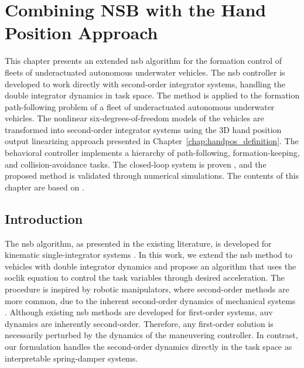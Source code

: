 \chapter{Combining NSB with the Hand Position Approach}
\label{chap:handpos_NSB}

This chapter presents an extended \acrfull{nsb} algorithm for the formation control of fleets of underactuated autonomous underwater vehicles. 
The \gls{nsb} controller is developed to work directly with second-order integrator systems, handling the double integrator dynamics in task space. 
The method is applied to the formation path-following problem of a fleet of underactuated autonomous underwater vehicles. 
The nonlinear six-degrees-of-freedom models of the vehicles are transformed into second-order integrator systems using the 3D hand position output linearizing approach presented in Chapter~\ref{chap:handpos_definition}. 
The behavioral controller implements a hierarchy of path-following, formation-keeping, and collision-avoidance tasks.
The closed-loop system is proven , and the proposed method is validated through numerical simulations.
The contents of this chapter are based on \cite{lie_formation_2023}.

\section{Introduction}

The \gls{nsb} algorithm, as presented in the existing literature, is developed for kinematic single-integrator systems \cite{arrichiello_formation_2006,matous_singularity_2023,eek_formation_2021}. In this work, we extend the \gls{nsb} method to vehicles with double integrator dynamics and propose an algorithm that uses the \acrlong{soclik} equation to control the task variables through desired acceleration. The procedure is inspired by robotic manipulators, where second-order methods are more common,  due to the inherent second-order dynamics of mechanical systems \cite{siciliano_differential_2009, chiaverini_kinematically_2008}. Although existing \gls{nsb} methods are developed for first-order systems, \gls{auv} dynamics are inherently second-order. Therefore, any first-order solution is necessarily perturbed by the dynamics of the maneuvering controller. In contrast, our formulation handles the second-order dynamics directly in the task space as interpretable spring-damper systems.

